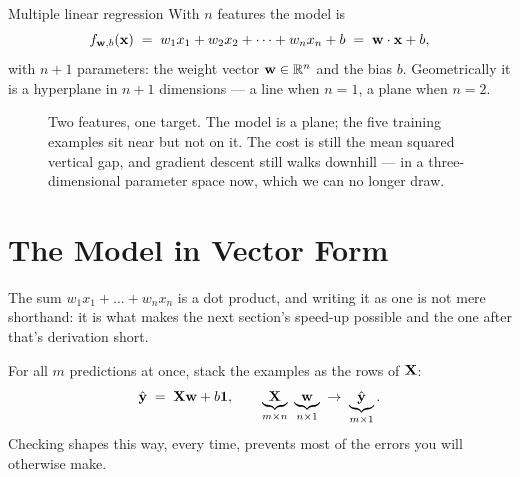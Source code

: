 \begin{defbox}{Multiple linear regression}
With $n$ features the model is
\[
  f_{\mathbf{w},b}(\mathbf{x}) \;=\; w_1x_1 + w_2x_2 + \dots + w_nx_n + b
                \;=\; \mathbf{w}\cdot\mathbf{x} + b ,
\]
with $n+1$ parameters: the weight vector $\mathbf{w}\in\mathbb{R}^{n}$ and the bias $b$.
Geometrically it is a hyperplane in $n+1$ dimensions --- a line when $n=1$, a
plane when $n=2$.
\end{defbox}

\begin{figure}[htbp]
  \centering
  \caption{Two features, one target. The model is a plane; the five training
  examples sit near but not on it. The cost is still the mean squared vertical
  gap, and gradient descent still walks downhill --- in a three-dimensional
  parameter space now, which we can no longer draw.}
  \label{fig:plane}
\end{figure}

\section{The Model in Vector Form}
\label{sec:vector-form}

The sum $w_1x_1 + \dots + w_nx_n$ is a dot product, and writing it as one is not
mere shorthand: it is what makes the next section's speed-up possible and the
one after that's derivation short.

For all $m$ predictions at once, stack the examples as the rows of $\mathbf{X}$:
\[
  \hat{\mathbf{y}} \;=\; \mathbf{X}\mathbf{w} + b\mathbf{1},
  \qquad
  \underbrace{\mathbf{X}}_{m\times n}\ \underbrace{\mathbf{w}}_{n\times 1}
  \;\to\;\underbrace{\hat{\mathbf{y}}}_{m\times 1}.
\]
Checking shapes this way, every time, prevents most of the errors you will
otherwise make.

